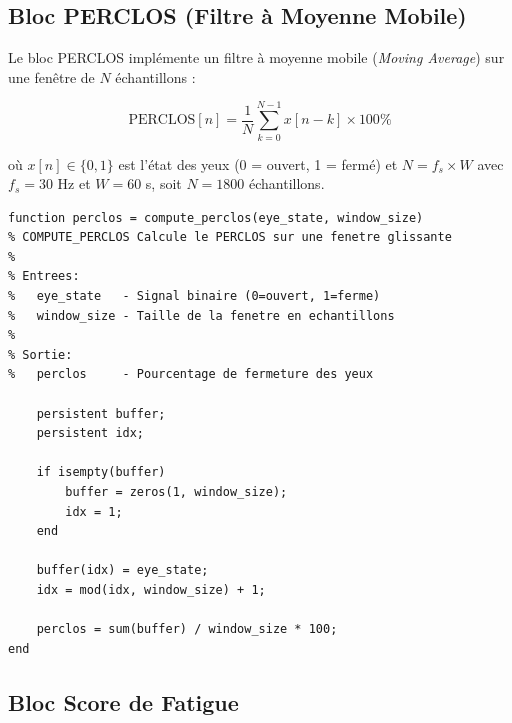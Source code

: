 \subsection{Bloc PERCLOS (Filtre à Moyenne Mobile)}

Le bloc PERCLOS implémente un filtre à moyenne mobile (\textit{Moving Average}) sur une fenêtre de $N$ échantillons :

\begin{equation}
\text{PERCLOS}[n] = \frac{1}{N} \sum_{k=0}^{N-1} x[n - k] \times 100\%
\label{eq:perclos_simulink}
\end{equation}

où $x[n] \in \{0, 1\}$ est l'état des yeux (0 = ouvert, 1 = fermé) et $N = f_s \times W$ avec $f_s = 30$ Hz et $W = 60$ s, soit $N = 1800$ échantillons.

\begin{lstlisting}[style=matlabstyle, caption={Implémentation du bloc PERCLOS en MATLAB.}, label={lst:perclos_matlab}]
function perclos = compute_perclos(eye_state, window_size)
% COMPUTE_PERCLOS Calcule le PERCLOS sur une fenetre glissante
%
% Entrees:
%   eye_state   - Signal binaire (0=ouvert, 1=ferme)
%   window_size - Taille de la fenetre en echantillons
%
% Sortie:
%   perclos     - Pourcentage de fermeture des yeux

    persistent buffer;
    persistent idx;
    
    if isempty(buffer)
        buffer = zeros(1, window_size);
        idx = 1;
    end
    
    buffer(idx) = eye_state;
    idx = mod(idx, window_size) + 1;
    
    perclos = sum(buffer) / window_size * 100;
end
\end{lstlisting}

\subsection{Bloc Score de Fatigue}

